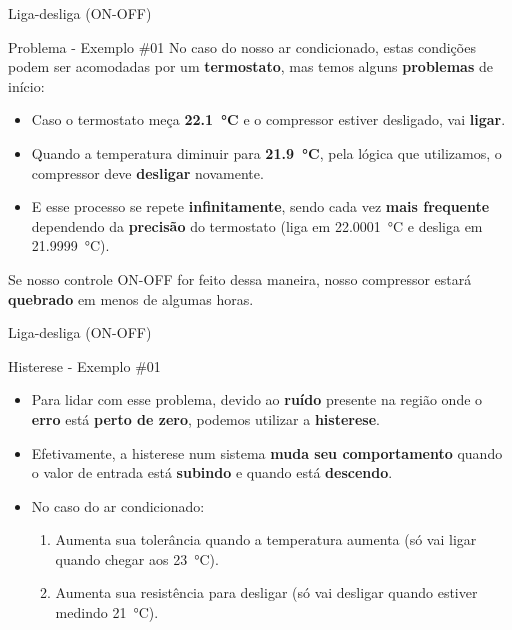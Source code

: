 \begin{frame}{Liga-desliga (ON-OFF)}
	\begin{block}{Problema - Exemplo \#01}
		No caso do nosso ar condicionado, estas condições podem ser acomodadas por um \textbf{termostato}, mas temos alguns \textbf{problemas} de início:
		\begin{itemize}
			\item Caso o termostato meça \textbf{\SI{22.1}{\degreeCelsius}} e o compressor estiver desligado, vai \textbf{ligar}.
			\item Quando a temperatura diminuir para \textbf{\SI{21.9}{\degreeCelsius}}, pela lógica que utilizamos, o compressor deve \textbf{desligar} novamente.
			\item E esse processo se repete \textbf{infinitamente}, sendo cada vez \textbf{mais frequente} dependendo da \textbf{precisão} do termostato (liga em \SI{22.0001}{\degreeCelsius} e desliga em \SI{21.9999}{\degreeCelsius}).
		\end{itemize}
		Se nosso controle ON-OFF for feito dessa maneira, nosso compressor estará \textbf{quebrado} em menos de algumas horas.
	\end{block}
\end{frame}


\begin{frame}{Liga-desliga (ON-OFF)}
	\begin{block}{Histerese - Exemplo \#01}
		\begin{itemize}
			\item Para lidar com esse problema, devido ao \textbf{ruído} presente na região onde o \textbf{erro} está \textbf{perto de zero}, podemos utilizar a \textbf{histerese}.
			\item Efetivamente, a histerese num sistema \textbf{muda seu comportamento} quando o valor de entrada está \textbf{subindo} e quando está \textbf{descendo}.
			\item No caso do ar condicionado:
			\begin{enumerate}
				\item \normalsize Aumenta sua tolerância quando a temperatura aumenta (só vai ligar quando chegar aos \SI{23}{\degreeCelsius}).
				\item \normalsize Aumenta sua resistência para desligar (só vai desligar quando estiver medindo \SI{21}{\degreeCelsius}).
			\end{enumerate}
		\end{itemize}
		
	\end{block}
	
\end{frame}


